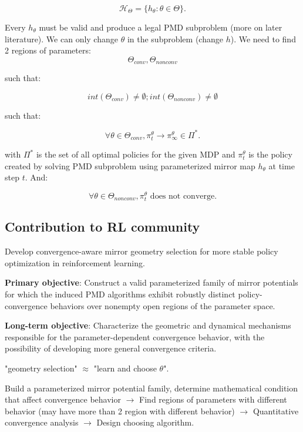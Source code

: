 \documentclass[11pt,a4paper]{article}
\begin{document}
\[
\mathcal{H}_{\Theta} = \{h_{\theta}: \theta \in \Theta\}.
\]

Every $h_{\theta}$ must be valid and produce a legal PMD subproblem (more on later literature). We can only change $\theta$ in the subproblem (change $h$). We need to find 2 regions of parameters:
\[ 
\Theta_{conv}, \Theta_{nonconv}
\]

such that:

\[
int(\Theta_{conv}) \neq \emptyset; int(\Theta_{nonconv}) \neq \emptyset 
\]

such that:

\[
\forall \theta \in \Theta_{conv}, \pi^{\theta}_t \longrightarrow \pi^{\theta}_{\infty} \in \Pi^*.
\]

with $\Pi^*$ is the set of all optimal policies for the given MDP and $\pi^{\theta}_t$ is the policy created by solving PMD subproblem using parameterized mirror map $h_\theta$ at time step $t$. And:

\[
\forall \theta \in \Theta_{nonconv}, \pi^{\theta}_t \text{ does not converge}.
\]


\subsection{Contribution to RL community}
Develop convergence-aware mirror geometry selection for more stable policy optimization in reinforcement learning.

\textbf{Primary objective}: Construct a valid parameterized family of mirror potentials for which the induced PMD algorithms exhibit robustly distinct policy-convergence behaviors over nonempty open regions of the parameter space.

\textbf{Long-term objective}: Characterize the geometric and dynamical mechanisms responsible for the parameter-dependent convergence behavior, with the possibility of developing more general convergence criteria.

\begin{note}
"geometry selection" $\approx$ "learn and choose $\theta$".
\end{note}

\begin{note}
Build a parameterized mirror potential family, determine mathematical condition that affect convergence behavior $\rightarrow$ Find regions of parameters with different behavior (may have more than 2 region with different behavior) $\rightarrow$ Quantitative convergence analysis $\rightarrow$ Design choosing algorithm.
\end{note}
\end{document}
